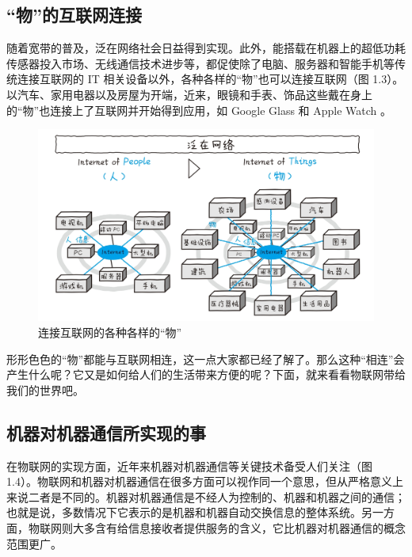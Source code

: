 \documentclass[12pt,UTF8]{ctexbook}
\begin{document}
\subsection{“物”的互联网连接}

随着宽带的普及，泛在网络社会日益得到实现。此外，能搭载在机器上的超低功耗传感器投入市场、无线通信技术进步等，都促使除了电脑、服务器和智能手机等传统连接互联网的 IT 相关设备以外，各种各样的“物”也可以连接互联网（图 1.3）。以汽车、家用电器以及房屋为开端，近来，眼镜和手表、饰品这些戴在身上的“物”也连接上了互联网并开始得到应用，如 Google Glass 和 Apple Watch 。

\begin{figure}[htbp]
	\centering
	\includegraphics[width=1\linewidth]{3}
	\caption{连接互联网的各种各样的“物”}
	\label{fig:1}
\end{figure}

形形色色的“物”都能与互联网相连，这一点大家都已经了解了。那么这种“相连”会产生什么呢？它又是如何给人们的生活带来方便的呢？下面，就来看看物联网带给我们的世界吧。

\subsection{机器对机器通信所实现的事}

在物联网的实现方面，近年来机器对机器通信等关键技术备受人们关注（图 1.4）。物联网和机器对机器通信在很多方面可以视作同一个意思，但从严格意义上来说二者是不同的。机器对机器通信是不经人为控制的、机器和机器之间的通信；也就是说，多数情况下它表示的是机器和机器自动交换信息的整体系统。另一方面，物联网则大多含有给信息接收者提供服务的含义，它比机器对机器通信的概念范围更广。
\end{document}
